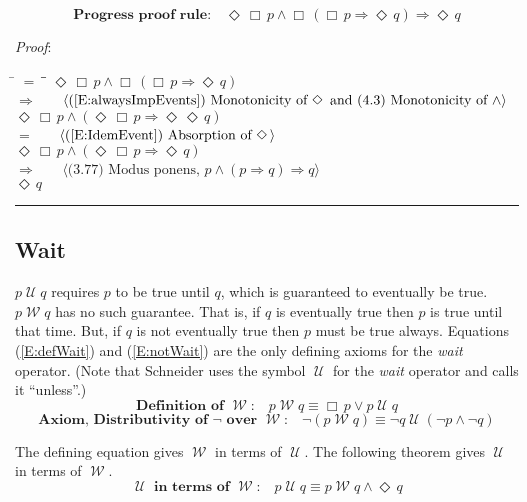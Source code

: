 \documentclass[12pt, fleqn, leqno]{article}
\newcommand{\lgap}{2pt}                             %
\newcommand{\mymathindent}{24pt}                    %
\newcommand{\impl}{\ensuremath{\Rightarrow}}        %
\newcommand{\Until}{\;\mathcal{U}\;}
\newcommand{\Wait}{\;\mathcal{W}\;}
\newcommand{\Event}{\Diamond\,}
\newcommand{\Always}{\Box\,}
\newcommand{\myqed}{\rule[-.23ex]{1.2ex}{2.0ex}}
\newcommand{\myqedtab}{\hspace{384pt}}              %
\newcommand{\Gll} {\langle}                         %
\newcommand{\Ggg} {\rangle}                         %
\newcommand{\Hint}[1]     {\ \ \ $\Gll              \mbox{#1} \Ggg$ }   %
\begin{document}
\begin{equation}\label{E:PrProofRule}
\textbf{Progress proof rule:}\quad \Event\Always p \land \Always(\Always p \impl \Event q) \impl \Event q
\end{equation}

\emph{Proof}:
\begin{tabbing}
\hspace{\mymathindent} \= $= \;$ \= \myqedtab \= \kill
\> \>   $\Event\Always p \land \Always(\Always p \impl \Event q)$\\[\lgap]
\> $\impl$  \>  \Hint{(\ref{E:alwaysImpEvents}) Monotonicity of $\Event$ and (4.3) Monotonicity of $\land$}\\[\lgap]
\> \>   $\Event\Always p \land (\Event\Always p \impl \Event\Event q)$\\[\lgap]
\> $=$  \>  \Hint{(\ref{E:IdemEvent}) Absorption of $\Event$}\\[\lgap]
\> \>   $\Event\Always p \land (\Event\Always p \impl \Event q)$\\[\lgap]
\> $\impl$  \>  \Hint{(3.77) Modus ponens, $p\land (p\impl q)\impl q$}\\[\lgap]
\> \>   $\Event q$ \quad \myqed
\end{tabbing}

\subsection{Wait}\label{section-wait}

$p\Until q$ requires $p$ to be true until $q$, which is guaranteed to eventually be true.
$p\Wait q$ has no such guarantee.
That is, if $q$ is eventually true then $p$ is true until that time.
But, if $q$ is not eventually true then $p$ must be true always.
Equations (\ref{E:defWait}) and (\ref{E:notWait}) are the only defining axioms for the \textit{wait} operator.
(Note that Schneider \cite{Schn} uses the symbol $\Until$ for the \textit{wait} operator and calls it ``unless''.)
\begin{equation}\label{E:defWait}
\textbf{Definition of $\Wait$:}\quad p \Wait q \equiv \Always p \lor p \Until q 
\end{equation}
\begin{equation}\label{E:notWait}
\textbf{Axiom, Distributivity of $\neg$ over $\Wait$:}\quad \neg (p \Wait q) \equiv \neg q \Until (\neg p \land \neg q)
\end{equation}



The defining equation gives $\Wait$ in terms of $\Until$. The following theorem gives $\Until$ in terms of $\Wait$.
\begin{equation}\label{E:untilFromWait}
\textbf{$\Until$ in terms of $\Wait$:}\quad p \Until q \equiv p \Wait q\land \Event q
\end{equation}
\end{document}
